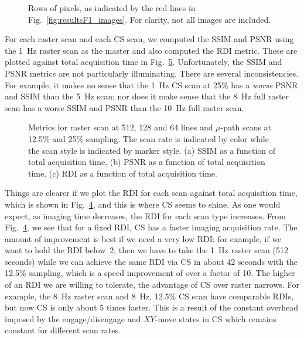 \documentclass[journal]{IEEEtran}
\begin{document}
\begin{figure}
  
  \caption{Rows of pixels, as indicated by the red lines in
    Fig.~\ref{fig:resultsF1_images}. For clarity, not all images are
    included.}
  \label{fig:pixel_rows}
\end{figure}
For each raster scan and each CS scan, we computed the SSIM and PSNR
using the 1~Hz raster scan as the master and also computed the RDI
metric. These are plotted against total acquisition time in
Fig.~\ref{fig:time_vs_metrics}. Unfortunately, the
SSIM and PSNR metrics are not particularly illuminating. There are
several inconsistencies. For example, it makes no sense that the 1~Hz CS
scan at 25\% has a \emph{worse} PSNR and SSIM than the 5~Hz scan; nor
does it make sense that the 8~Hz full raster scan has a worse SSIM and
PSNR than the 10~Hz full raster scan.

\begin{figure}[t!]
  \centering
  \begin{subfigure}{0.329\linewidth}
    \centering
    
    \caption{}
    \label{fig:time_ssim}
  \end{subfigure}
  \begin{subfigure}{0.329\linewidth}
    \centering
    
    \caption{}
    \label{fig:time_psnr}
  \end{subfigure}
  \begin{subfigure}{0.329\linewidth}
    \centering
    
    \caption{}
    \label{fig:time_damage}
  \end{subfigure}
  \caption{Metrics for raster scan at 512, 128 and 64 lines and
    $\mu$-path scans at 12.5\% and 25\% sampling. The scan rate is
    indicated by color while the scan style is indicated by marker
    style. (a) SSIM as a function of total acquisition time. (b) PSNR
    as a function of total acquisition time. (c) RDI as a function of
    total acquisition time.}
  \label{fig:time_vs_metrics}
\end{figure}


Things are clearer if we plot the RDI for each scan against total
acquisition time, which is shown in Fig.~\ref{fig:time_damage}, and
this is where CS seems to shine. As one would expect, as imaging time
decreases, the RDI for each scan type increases. From
Fig.~\ref{fig:time_damage}, we see that for a fixed RDI, CS has a
faster imaging acquisition rate. The amount of improvement is best if
we need a very low RDI: for example, if we want to hold the RDI below~2, then we have to take the 1~Hz raster scan (512 seconds) while we
can achieve the same RDI via CS in about 42 seconds with the 12.5\%
sampling, which is a speed improvement of over a factor of 10. The higher of an
RDI we are willing to tolerate, the advantage of CS over raster
narrows. For example, the 8~Hz raster scan and 8~Hz, 12.5\% CS scan
have comparable RDIs, but now CS is only about 5 times faster. This is
a result of the constant overhead imposed by the engage/disengage and
$XY$-move states in CS which remains constant for different scan
rates.
\end{document}
